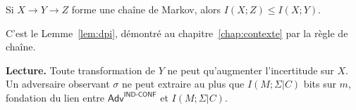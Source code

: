 \begin{sloppypar}
\begin{lemma}\label{lem:ann_dpi}
Si $X \to Y \to Z$ forme une chaîne de Markov, alors
$I(X;Z) \leq I(X;Y)$.
\end{lemma}

\begin{Preuve}
C'est le Lemme~\ref{lem:dpi}, d\'emontr\'e au chapitre~\ref{chap:contexte} par la
r\`egle de cha\^ine.
\end{Preuve}

\noindent\textbf{Lecture.} Toute transformation de $Y$ ne peut
qu'augmenter l'incertitude sur $X$. Un adversaire observant $\sigma$
ne peut extraire au plus que $I(M;\Sigma|C)$ bits sur $m$, fondation
du lien entre $\mathsf{Adv}^{\mathsf{IND\text{-}CONF}}$ et $I(M;\Sigma|C)$.
\end{sloppypar}

